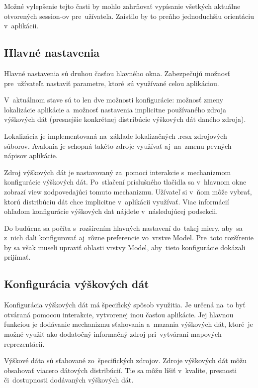 Možné vylepšenie tejto časti by mohlo zahrňovať vypísanie všetkých aktuálne otvorených session-ov pre~užívateľa. Zaistilo by to preňho jednoduchšiu orientáciu v~aplikácii.

\subsection{Hlavné nastavenia}

Hlavné nastavenia sú druhou časťou hlavného okna. Zabezpečujú možnosť pre~užívateľa nastaviť parametre, ktoré~sú využívané celou aplikáciou. 

V~aktuálnom stave sú to len dve možnosti konfigurácie: možnosť zmeny lokalizácie aplikácie a~možnosť nastavenia implicitne používaného zdroja výškových dát (presnejšie konkrétnej distribúcie výškových dát daného zdroja). 

Lokalizácia je implementovaná na~základe lokalizačných .resx zdrojových súborov. Avalonia je schopná takéto zdroje využívať aj~na~zmenu pevných nápisov aplikácie. %

Zdroj výškových dát je nastavovaný za~pomoci interakcie s~mechanizmom konfigurácie výškových dát. Po~stlačení príslušného tlačidla sa v~hlavnom okne zobrazí view zodpovedajúci tomuto mechanizmu. Užívateľ si v~ňom môže vybrať, ktorú distribúciu dát chce implicitne v~aplikácii využívať. Viac informácií ohľadom konfigurácie výškových dat nájdete v~následujúcej podsekcii.

Do budúcna sa počíta s~rozšírením hlavných nastavení do~takej miery, aby~sa z~nich dali konfigurovať aj~rôzne preferencie vo~vrstve Model. Pre~toto rozšírenie by sa však museli upraviť oblasti vrstvy Model, aby~tieto konfigurácie dokázali prijímať.

\subsection{Konfigurácia výškových dát}\label{konfiguracia_vyskovych_dat}

Konfigurácia výškových dát má špecifický spôsob využitia. Je určená na~to byť otváraná pomocou interakcie, vytvorenej inou časťou aplikácie. Jej hlavnou funkciou je dodávanie mechanizmu sťahovania a~mazania výškových dát, ktoré~je možné využiť ako dodatočný informačný zdroj pri~vytváraní mapových reprezentácií. 

Výškové dáta sú sťahované zo~špecifických zdrojov. Zdroje výškových dát môžu obsahovať viacero dátových distribúcií. Tie sa môžu líšiť v~kvalite, presnosti či~dostupnosti dodávaných výškových dát. 

